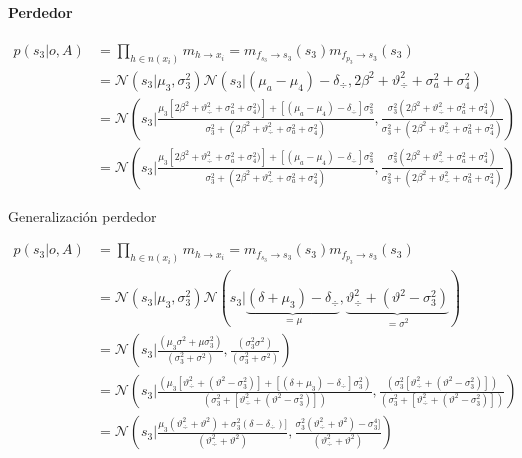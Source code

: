 \documentclass[11pt,twoside,spanish]{report} %
\begin{document}
\paragraph{Perdedor}
\begin{equation}
	\begin{split}
		p(s_3|o,A) &= \prod_{h \in n(x_i)} m_{h \rightarrow x_i} = m_{f_{s_3} \rightarrow s_3}(s_3) m_{f_{p_3} \rightarrow s_3}(s_3) \\
		&=  \mathcal{N}(s_3| \mu_3, \sigma_3^2) \mathcal{N}(s_3|(\mu_a - \mu_4) - \delta_{\div}, 2\beta^2+\vartheta_{\div}^2 + \sigma_a^2 + \sigma_4^2 )\\
		&= \mathcal{N}\left(s_3\Big|  \frac{ \mu_3[2\beta^2+\vartheta_{\div}^2 + \sigma_a^2 + \sigma_4^2 )]+[(\mu_a - \mu_4) - \delta_{\div}]\sigma_3^2}{\sigma_3^2+( 2\beta^2+\vartheta_{\div}^2 + \sigma_a^2 + \sigma_4^2 )} , \frac{\sigma_3^2( 2\beta^2+\vartheta_{\div}^2 + \sigma_a^2 + \sigma_4^2 )}{\sigma_3^2+( 2\beta^2+\vartheta_{\div}^2 + \sigma_a^2 + \sigma_4^2 )} \right) \\
		&= \mathcal{N}\left(s_3\Big|  \frac{ \mu_3[2\beta^2+\vartheta_{\div}^2 + \sigma_a^2 + \sigma_4^2 )]+[(\mu_a - \mu_4) - \delta_{\div}]\sigma_3^2}{\sigma_3^2+( 2\beta^2+\vartheta_{\div}^2 + \sigma_a^2 + \sigma_4^2 )} , \frac{\sigma_3^2( 2\beta^2+\vartheta_{\div}^2 + \sigma_a^2 + \sigma_4^2 )}{\sigma_3^2+( 2\beta^2+\vartheta_{\div}^2 + \sigma_a^2 + \sigma_4^2 )} \right)
	\end{split}
\end{equation}

Generalizaci\'on perdedor

\begin{equation}
	\begin{split}
		p(s_3|o,A) &= \prod_{h \in n(x_i)} m_{h \rightarrow x_i} = m_{f_{s_3} \rightarrow s_3}(s_3) m_{f_{p_3} \rightarrow s_3}(s_3) \\
		&=  \mathcal{N}(s_3| \mu_3, \sigma_3^2) \mathcal{N}( s_3|   \underbrace{(\delta + \mu_3) - \delta_{\div}}_{=\mu} , \underbrace{\vartheta_{\div}^2 + (\vartheta^2 - \sigma_3^2 )}_{=\sigma^2})\\
		&=  \mathcal{N}\left(s_3\Big|\frac{(\mu_3\sigma^2+\mu\sigma_3^2)}{(\sigma_3^2+\sigma^2)}, \frac{(\sigma_3^2\sigma^2)}{(\sigma_3^2+\sigma^2)}\right)\\
		&=  \mathcal{N}\left(s_3\Big|\frac{(\mu_3[\vartheta_{\div}^2 + (\vartheta^2 - \sigma_3^2 )]+[(\delta + \mu_3) - \delta_{\div}]\sigma_3^2)}{(\sigma_3^2+[\vartheta_{\div}^2 + (\vartheta^2 - \sigma_3^2 )])}, \frac{(\sigma_3^2[\vartheta_{\div}^2 + (\vartheta^2 - \sigma_3^2 )])}{(\sigma_3^2+[\vartheta_{\div}^2 + (\vartheta^2 - \sigma_3^2 )])}\right)\\
		&= \mathcal{N}\left(s_3\Big| \frac{\mu_3 (\vartheta_{\div}^2 + \vartheta^2)+\sigma_3^2(\delta-\delta_{\div})]}{(\vartheta_{\div}^2 + \vartheta^2 )},\frac{\sigma_3^2(\vartheta_{\div}^2 + \vartheta^2) - \sigma_3^4 ]}{(\vartheta_{\div}^2 + \vartheta^2)}\right)
	\end{split}
\end{equation}
\end{document}
